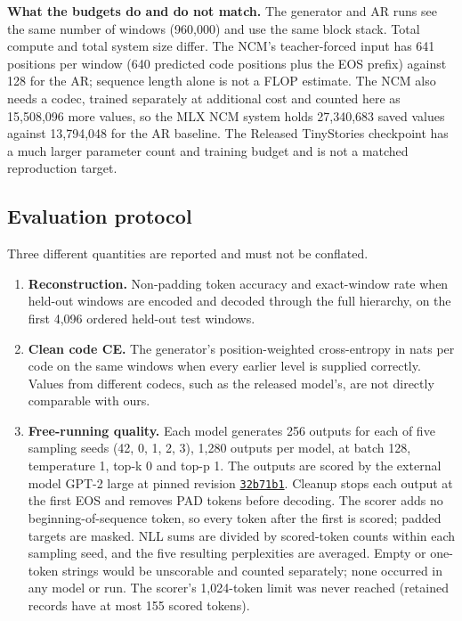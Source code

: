 \documentclass[
  british,
]{article}
\newcounter{none} %
\providecommand{\tightlist}{%
  \setlength{\itemsep}{0pt}\setlength{\parskip}{0pt}}
\begin{document}
\textbf{What the budgets do and do not match.} The generator and AR runs
see the same number of windows (960,000) and use the same block stack.
Total compute and total system size differ. The NCM's teacher-forced
input has 641 positions per window (640 predicted code positions plus
the EOS prefix) against 128 for the AR; sequence length alone is not a
FLOP estimate. The NCM also needs a codec, trained separately at
additional cost and counted here as 15,508,096 more values, so the MLX
NCM system holds 27,340,683 saved values against 13,794,048 for the AR
baseline. The Released TinyStories checkpoint has a much larger
parameter count and training budget and is not a matched reproduction
target.

\subsection{Evaluation protocol}\label{evaluation-protocol}

Three different quantities are reported and must not be conflated.

\begin{enumerate}
\def\labelenumi{\arabic{enumi}.}
\tightlist
\item
  \textbf{Reconstruction.} Non-padding token accuracy and exact-window
  rate when held-out windows are encoded and decoded through the full
  hierarchy, on the first 4,096 ordered held-out test windows.
\item
  \textbf{Clean code CE.} The generator's position-weighted
  cross-entropy in nats per code on the same windows when every earlier
  level is supplied correctly. Values from different codecs, such as the
  released model's, are not directly comparable with ours.
\item
  \textbf{Free-running quality.} Each model generates 256 outputs for
  each of five sampling seeds (42, 0, 1, 2, 3), 1,280 outputs per model,
  at batch 128, temperature 1, top-k 0 and top-p 1. The outputs are
  scored by the external model GPT-2 large at pinned revision
  \href{https://huggingface.co/openai-community/gpt2-large/tree/32b71b12589c2f8d625668d2335a01cac3249519}{\texttt{32b71b1}}.
  Cleanup stops each output at the first EOS and removes PAD tokens
  before decoding. The scorer adds no beginning-of-sequence token, so
  every token after the first is scored; padded targets are masked. NLL
  sums are divided by scored-token counts within each sampling seed, and
  the five resulting perplexities are averaged. Empty or one-token
  strings would be unscorable and counted separately; none occurred in
  any model or run. The scorer's 1,024-token limit was never reached
  (retained records have at most 155 scored tokens).
\end{enumerate}
\end{document}
